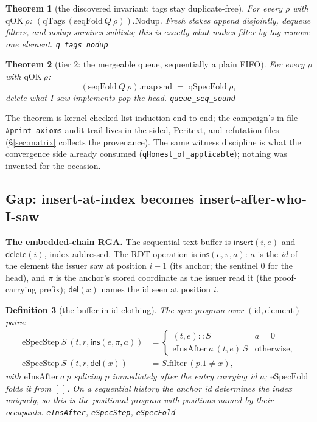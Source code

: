 \documentclass[11pt]{article}
\newtheorem{theorem}{Theorem}[section]
\newtheorem{definition}[theorem]{Definition}
\newcommand{\lean}[1]{\texttt{#1}}
\newcommand{\code}[1]{\texttt{#1}}
\newcommand{\del}{\mathsf{del}}
\newcommand{\ins}{\mathsf{ins}}
\begin{document}
\begin{theorem}[the discovered invariant: tags stay duplicate-free]
\label{thm:qtagsnodup}
For every $\rho$ with $\mathrm{qOK}\ \rho$:
$(\mathrm{qTags}\,(\mathrm{seqFold}\ Q\ \rho)).\mathrm{Nodup}$.
Fresh stakes append disjointly, dequeue filters, and nodup survives
sublists; this is exactly what makes filter-by-tag remove one
element.
\hfill\lean{q\_tags\_nodup}
\end{theorem}

\begin{theorem}[tier 2: the mergeable queue, sequentially a plain
FIFO]
\label{thm:queueseq}
For every $\rho$ with $\mathrm{qOK}\ \rho$:
\[
  (\mathrm{seqFold}\ Q\ \rho).\mathrm{map}\ \mathrm{snd}
  \;=\; \mathrm{qSpecFold}\ \rho ,
\]
delete-what-I-saw implements pop-the-head.
\hfill\lean{queue\_seq\_sound}
\end{theorem}

\noindent The theorem is kernel-checked list induction end to end;
the campaign's in-file \code{\#print axioms} audit trail lives in the
sided, Peritext, and refutation files (\S\ref{sec:matrix} collects
the provenance). The same witness discipline is what the convergence
side already consumed (\code{qHonest\_of\_applicable}); nothing was
invented for the occasion.

\subsection{Gap: insert-at-index becomes insert-after-who-I-saw}
\label{sec:rga-spec}

\textbf{The embedded-chain RGA.} The sequential text buffer is
$\mathsf{insert}(i, e)$ and $\mathsf{delete}(i)$, index-addressed. The
RDT operation is $\ins(e, \pi, a)$: $a$ is the \emph{id} of the
element the issuer saw at position $i - 1$ (its anchor; the sentinel
$0$ for the head), and $\pi$ is the anchor's stored coordinate as the
issuer read it (the proof-carrying prefix); $\del(x)$ names the id
seen at position $i$.

\begin{definition}[the buffer in id-clothing]
\label{def:espec}
The spec program over $(\mathrm{id}, \mathrm{element})$ pairs:
\[
\begin{aligned}
  \mathrm{eSpecStep}\ S\ (t, r, \ins(e, \pi, a)) &=
    \begin{cases}
      (t, e) :: S & a = 0 \\
      \mathrm{eInsAfter}\ a\ (t, e)\ S & \text{otherwise,}
    \end{cases} \\
  \mathrm{eSpecStep}\ S\ (t, r, \del(x)) &=
    S.\mathrm{filter}\,(p.1 \ne x) ,
\end{aligned}
\]
with $\mathrm{eInsAfter}\ a\ p$ splicing $p$ immediately after the
entry carrying id $a$; $\mathrm{eSpecFold}$ folds it from $[\,]$. On
a sequential history the anchor id determines the index uniquely, so
this \emph{is} the positional program with positions named by their
occupants.
\hfill\lean{eInsAfter}, \lean{eSpecStep}, \lean{eSpecFold}
\end{definition}
\end{document}
